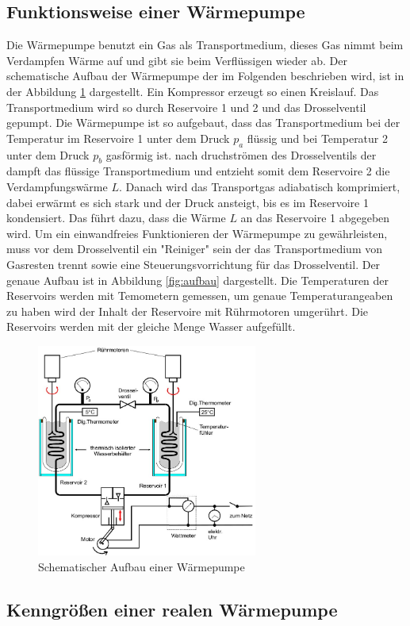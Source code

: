 \subsection{Funktionsweise einer Wärmepumpe}
Die Wärmepumpe benutzt ein Gas als Transportmedium, dieses Gas nimmt
beim Verdampfen Wärme auf und gibt sie beim Verflüssigen wieder ab. Der
schematische Aufbau der Wärmepumpe der im Folgenden beschrieben wird,
ist in der Abbildung \ref{fig:schema} dargestellt.
Ein Kompressor erzeugt so einen Kreislauf. Das Transportmedium wird so durch
Reservoire 1 und 2 und das Drosselventil gepumpt. Die Wärmepumpe ist so
aufgebaut, dass das Transportmedium bei der Temperatur im Reservoire 1 unter dem
Druck $p_a$ flüssig und bei Temperatur 2 unter dem Druck $p_b$ gasförmig ist.
nach druchströmen des Drosselventils der dampft das flüssige Transportmedium und
entzieht somit dem Reservoire 2 die Verdampfungswärme $L$. Danach wird das
Transportgas adiabatisch komprimiert, dabei erwärmt es sich stark und der Druck
ansteigt, bis es im Reservoire 1 kondensiert. Das führt dazu, dass die
Wärme $L$ an das Reservoire 1 abgegeben wird. Um ein einwandfreies Funktionieren
der Wärmepumpe zu gewährleisten, muss vor dem Drosselventil ein "Reiniger" sein
der das Transportmedium von Gasresten trennt sowie eine Steuerungsvorrichtung für
das Drosselventil. Der genaue Aufbau ist in Abbildung \ref{fig:aufbau} dargestellt.
Die Temperaturen der Reservoirs werden mit Temometern gemessen, um genaue
Temperaturangeaben zu haben wird der Inhalt der Reservoire mit Rührmotoren
umgerührt. Die Reservoirs werden mit der gleiche Menge Wasser aufgefüllt.
\begin{figure}
  \centering
  \includegraphics[height=7cm]{logos/AufbauWaermepumpe.jpg}
  \caption{Schematischer Aufbau einer Wärmepumpe \cite{Anleitung}}
  \label{fig:schema}
\end{figure}
\FloatBarrier
\subsection{Kenngrößen einer realen Wärmepumpe}
